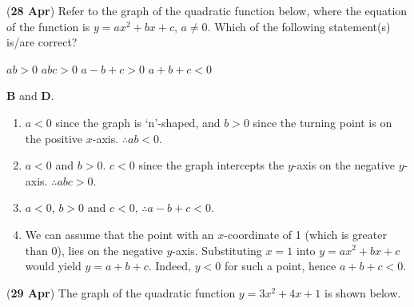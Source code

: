 \documentclass[12pt, answers]{exam}
\begin{document}
\begin{questions}
	\question (\textbf{28 Apr}) Refer to the graph of the quadratic function
	below, where the equation of the function is \(y = ax^2 + bx + c\), \(a \neq 0\).
	Which of the following statement(s) is/are correct?
	\begin{figure}[htpb]
		\centering
	\end{figure}

	\begin{oneparchoices}
		\choice \(ab > 0\)
		\choice \(abc > 0\)
		\choice \(a - b + c > 0\)
		\choice \(a + b + c < 0\)
	\end{oneparchoices}

	\begin{solution}
		\textbf{B} and \textbf{D}.
		\begin{enumerate}
			\item \(a < 0\) since the graph is `n'-shaped, and \(b > 0\) since the turning point is on the positive \(x\)-axis. \(\therefore ab < 0\).
			\item \(a < 0\) and \(b > 0\). \(c < 0\) since the graph intercepts the \(y\)-axis on the negative \(y\)-axis. \(\therefore abc > 0\).
			\item \(a < 0\), \(b > 0\) and \(c < 0\), \(\therefore a - b + c < 0\).
			\item We can assume that the point with an \(x\)-coordinate of \num{1}
			      (which is greater than 0), lies on the negative \(y\)-axis. Substituting
			      \(x = 1\) into \(y = ax^2 + bx + c\) would yield \(y = a + b + c\). Indeed,
			      \(y < 0\) for such a point, hence \(a + b + c < 0\).
		\end{enumerate}
	\end{solution}

	\question (\textbf{29 Apr}) The graph of the quadratic function \(y = 3x^{2} + 4x + 1\) is shown below.
	\begin{figure}[htpb]
		\centering
	\end{figure}
	\begin{parts}

\end{parts}
\end{questions}
\end{document}

